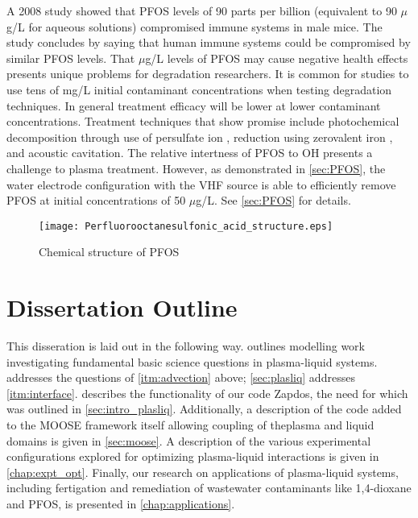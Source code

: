 A 2008 study showed that PFOS levels of 90 parts per billion (equivalent to 90 $\mu$g/L for aqueous solutions) compromised immune systems in male mice. \cite{betts2008chemical} The study concludes by saying that human immune systems could be compromised by similar PFOS levels. That $\mu$g/L levels of PFOS may cause negative health effects presents unique problems for degradation researchers. It is common for studies to use tens of mg/L initial contaminant concentrations when testing degradation techniques. In general treatment efficacy will be lower at lower contaminant concentrations. Treatment techniques that show promise include photochemical decomposition through use of persulfate ion \cite{hori2005efficient}, reduction using zerovalent iron \cite{hori2006efficient}, and acoustic cavitation. \cite{moriwaki2005sonochemical,cheng2008sonochemical} The relative intertness of PFOS to OH presents a challenge to plasma treatment. However, as demonstrated in \cref{sec:PFOS}, the water electrode configuration with the VHF source is able to efficiently remove PFOS at initial concentrations of 50 $\mu$g/L. See \cref{sec:PFOS} for details.

\begin{figure}[htbp]
  \centering
  \texttt{[image: Perfluorooctanesulfonic\_acid\_structure.eps]}
  \caption{Chemical structure of PFOS}
  \label{fig:PFOS_struct}
\end{figure}


\section{Dissertation Outline}

This disseration is laid out in the following way.  outlines modelling work investigating fundamental basic science questions in plasma-liquid systems.  addresses the questions of \cref{itm:advection} above; \cref{sec:plasliq} addresses \cref{itm:interface}.  describes the functionality of our code Zapdos, the need for which was outlined in \cref{sec:intro_plasliq}. Additionally, a description of the code added to the MOOSE framework itself allowing coupling of theplasma and liquid domains is given in \cref{sec:moose}. A description of the various experimental configurations explored for optimizing plasma-liquid interactions is given in \cref{chap:expt_opt}. Finally, our research on applications of plasma-liquid systems, including fertigation and remediation of wastewater contaminants like 1,4-dioxane and PFOS, is presented in \cref{chap:applications}.
